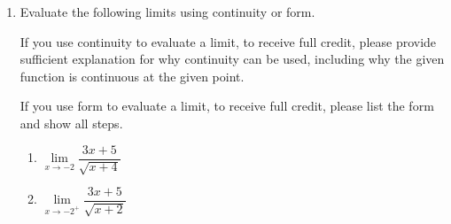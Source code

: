 \documentclass[11pt]{article}
\begin{document}
\begin{enumerate}
\begin{enumerate}
\vfill

\vfill


\item On the interval $[-3, 4]$, for what $a$-value(s) is $f(x)$ NOT continuous at $x=a$? For each point where there is a discontinuity, determine its type and explain why it belongs to that type.


\vfill

\vfill


\end{enumerate}


\newpage


\item Evaluate the following limits using continuity or form.

If you use continuity to evaluate a limit, to receive full credit, please provide sufficient explanation for why continuity can be used, including why the given function is continuous at the given point.

If you use form to evaluate a limit, to receive full credit, please list the form and show all steps. 


\begin{enumerate}
    \item $\lim\limits_{x\to -2}\dfrac{3x+5}{\sqrt{x+4}}$


    \vfill

    \item $\lim\limits_{x\to -2^+}\dfrac{3x+5}{\sqrt{x+2}}$


\end{enumerate}
\end{enumerate}
\end{document}
